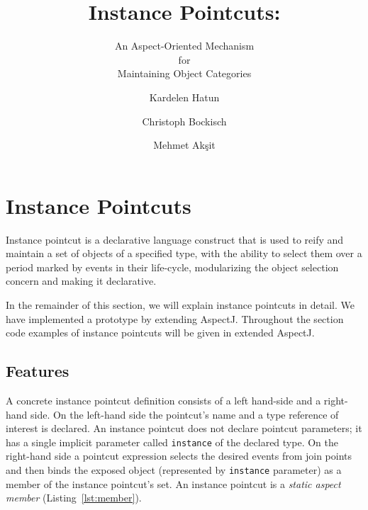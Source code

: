 \documentclass{acm_proc_article-sp}
\begin{document}
\title{Instance Pointcuts:}
\subtitle{An Aspect-Oriented Mechanism \\for \\Maintaining Object Categories}

\author{Kardelen Hatun \and Christoph Bockisch \and Mehmet Ak\c{s}it}




\section{Instance Pointcuts}
Instance pointcut is a declarative language construct that is used to reify and maintain a set of objects of a specified type, with the ability to select them over a period marked by events in their life-cycle, modularizing the object selection concern and making it declarative. 
 
In the remainder of this section, we will explain instance pointcuts in detail. We have implemented a prototype by extending AspectJ. Throughout the section code examples of instance pointcuts will be given in extended AspectJ.


\subsection{Features}

A concrete instance pointcut definition consists of a left hand-side and a right-hand side. 
On the left-hand side the pointcut's name and a type reference of interest is declared. 
An instance pointcut does not declare pointcut parameters; it has a single implicit parameter called \texttt{instance} of the declared type. 
On the right-hand side a pointcut expression selects the desired events from join points and then binds the exposed object (represented by \texttt{instance} parameter) as a member of the instance pointcut's set. 
An instance pointcut is a \emph{static aspect member} (Listing~\ref{lst:member}).%
\end{document}
